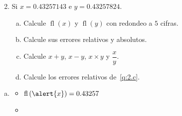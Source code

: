 \begin{frame}

	\begin{enumerate}\setcounter{enumi}{1}
		\item

		      Si $x=0.43257143$ e $y=0.43257824$.
		      \begin{multicols}{2}
			      \begin{enumerate}[a)]
				      \item\label{q:2.a}

				      Calcule
				      \begin{math}
					      \operatorname{fl}\left(x\right)
				      \end{math}
				      y
				      \begin{math}
					      \operatorname{fl}\left(y\right)
				      \end{math}
				      con redondeo a $5$ cifras.

				      \item\label{q:2.b}

				      Calcule sus errores relativos y absolutos.

				      \item\label{q:2.c}

				      Calcule $x+y$, $x-y$, $x\times y$ y $\dfrac{x}{y}$.

				      \item\label{q:2.d}

				      Calcule los errores relativos de~\eqref{q:2.c}.
			      \end{enumerate}
		      \end{multicols}
	\end{enumerate}

	\begin{solution}

		\begin{enumerate}[a)]
			\item

			      \begin{multicols}{2}
				      \begin{itemize}
					      \item

					            \begin{math}
						            \operatorname{fl}\left(\alert{x}\right)=0.43257
					            \end{math}

					      \item


\end{itemize}
\end{multicols}
\end{enumerate}
\end{solution}
\end{frame}
